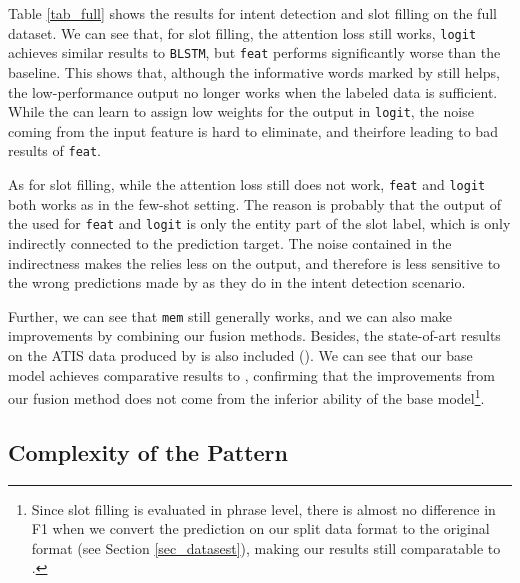 Table \ref{tab_full} shows the results for intent detection and slot filling on the full dataset. We can see that, for slot filling, the attention loss still works, \texttt{logit} achieves similar results to \texttt{BLSTM}, but \texttt{feat} performs significantly worse than the baseline. This shows that, although the informative words marked by \RE still helps, the low-performance \RE output no longer works when the labeled data is sufficient. While the \NN can learn to assign low weights for the \RE output in \texttt{logit}, the noise coming from the input feature is hard to eliminate, and theirfore leading to bad results of \texttt{feat}.

As for slot filling, while the attention loss still does not work, \texttt{feat} and \texttt{logit} both works as in the few-shot setting. The reason is probably that the output of the \RE used for \texttt{feat} and \texttt{logit} is only the entity part of the slot label, which is only indirectly connected to the prediction target. The noise contained in the indirectness makes the \NN relies less on the \RE output, and therefore is less sensitive to the wrong predictions made by \RE as they do in the intent detection scenario.

Further, we can see that \texttt{mem} still generally works, and we can also make improvements by combining our fusion methods. Besides, the state-of-art results on the ATIS data produced by \cite{liu2016attention} is also included (\LL). We can see that our base \BLSTM model achieves comparative results to \LL, confirming that the improvements from our fusion method does not come from the inferior ability of the base model\footnote{Since slot filling is evaluated in phrase level, there is almost no difference in F1 when we convert the prediction on our split data format to the original format (see Section \ref{sec_datasest}), making our results still comparatable to \LL.}.

\subsection{Complexity of the Pattern}

